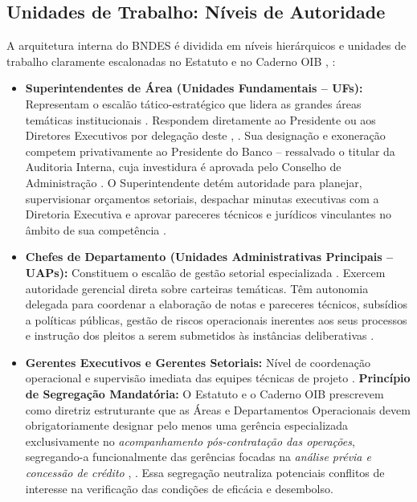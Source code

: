 \subsection{Unidades de Trabalho: Níveis de Autoridade}

A arquitetura interna do BNDES é dividida em níveis hierárquicos e unidades de trabalho claramente escalonadas no Estatuto e no Caderno OIB \cite[art.~78]{bndes2025estatuto}, \cite[p.~11, item II.4]{bndes2026oib}:

\begin{itemize}
    \item \textbf{Superintendentes de Área (Unidades Fundamentais -- UFs):} Representam o escalão tático-estratégico que lidera as grandes áreas temáticas institucionais \cite[p.~10, item II.1]{bndes2026oib}. Respondem diretamente ao Presidente ou aos Diretores Executivos por delegação deste \cite[arts.~40 e 78]{bndes2025estatuto}, \cite[p.~11, item II.3]{bndes2026oib}. Sua designação e exoneração competem privativamente ao Presidente do Banco \cite[p.~11, item III.3]{bndes2026oib} -- ressalvado o titular da Auditoria Interna, cuja investidura é aprovada pelo Conselho de Administração \cite[p.~11, item III.2]{bndes2026oib}. O Superintendente detém autoridade para planejar, supervisionar orçamentos setoriais, despachar minutas executivas com a Diretoria Executiva e aprovar pareceres técnicos e jurídicos vinculantes no âmbito de sua competência \cite[p.~11, 45, 158, 172]{bndes2026oib}.

    \item \textbf{Chefes de Departamento (Unidades Administrativas Principais -- UAPs):} Constituem o escalão de gestão setorial especializada \cite[p.~11, item II.4]{bndes2026oib}. Exercem autoridade gerencial direta sobre carteiras temáticas. Têm autonomia delegada para coordenar a elaboração de notas e pareceres técnicos, subsídios a políticas públicas, gestão de riscos operacionais inerentes aos seus processos e instrução dos pleitos a serem submetidos às instâncias deliberativas \cite[p.~45, 63, 120, 147]{bndes2026oib}.

    \item \textbf{Gerentes Executivos e Gerentes Setoriais:} Nível de coordenação operacional e supervisão imediata das equipes técnicas de projeto \cite[p.~11, item II.4]{bndes2026oib}. \textbf{Princípio de Segregação Mandatória:} O Estatuto e o Caderno OIB prescrevem como diretriz estruturante que as Áreas e Departamentos Operacionais devem obrigatoriamente designar pelo menos uma gerência especializada exclusivamente no \emph{acompanhamento pós-contratação das operações}, segregando-a funcionalmente das gerências focadas na \emph{análise prévia e concessão de crédito} \cite[art.~74,~XI]{bndes2025estatuto}, \cite[p.~11, item II.7; p.~126]{bndes2026oib}. Essa segregação neutraliza potenciais conflitos de interesse na verificação das condições de eficácia e desembolso.


\end{itemize}
